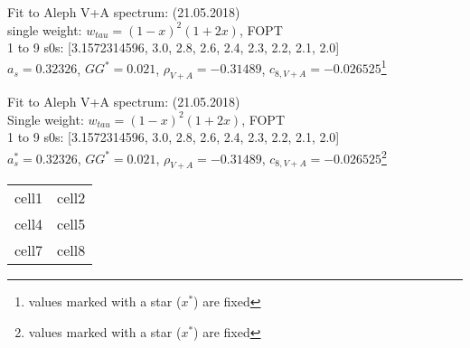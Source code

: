 \documentclass[12pt]{article}
\begin{document}

Fit to Aleph V+A spectrum: (21.05.2018) \\ 
single weight: $w_{tau} = (1-x)^2 (1+2x)$, FOPT \\
1 to 9 s0s: [3.1572314596, 3.0, 2.8, 2.6, 2.4, 2.3, 2.2, 2.1, 2.0] \\
$a_s=0.32326$, $GG^*=0.021$, $\rho_{V+A}=-0.31489$,
$c_{8,V+A}=-0.026525$\footnote{values marked with a star ($x^*$) are fixed} \\


Fit to Aleph V+A spectrum: (21.05.2018) \\ 
Single weight: $w_{tau} = (1-x)^2 (1+2x)$, FOPT \\
1 to 9 s0s: [3.1572314596, 3.0, 2.8, 2.6, 2.4, 2.3, 2.2, 2.1, 2.0] \\
$a_s^*=0.32326$, $GG^*=0.021$, $\rho_{V+A}=-0.31489$,
$c_{8,V+A}=-0.026525$\footnote{values marked with a star ($x^*$) are fixed} \\


\begin{center}
\begin{tabular}{ c c }
  cell1 & cell2 \\ 
  cell4 & cell5 \\  
  cell7 & cell8     
\end{tabular}
\end{center}
\end{document}
